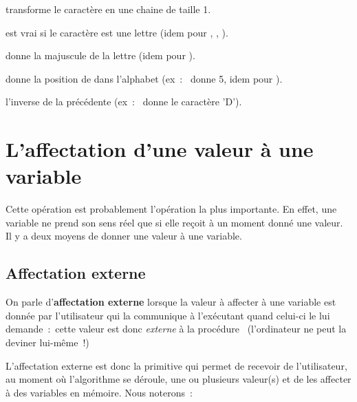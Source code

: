 			\begin{liste}
			\item {} transforme le caractère  en une chaine de taille 1.
			\item {} est vrai si le caractère  est une lettre
				(idem pour , 
				, 
				).
			\item {} donne la majuscule de la lettre 
				(idem pour ).
			\item {} donne la position de  dans l’alphabet (ex~:~ donne 5, 
			idem pour ).
			\item {} l’inverse de la précédente (ex~:~ donne le caractère ’D’).
			\end{liste}

			 
	\section{L’affectation d’une valeur à une variable}

		Cette opération est probablement l’opération la plus importante. En
		effet, une variable ne prend son sens réel que si elle reçoit à un
		moment donné une valeur. Il y a deux moyens de donner une valeur à une
		variable.

		\subsection{Affectation externe }

			On parle d’\textbf{affectation externe} lorsque la valeur à affecter à
			une variable est donnée par l’utilisateur qui la communique à
			l’exécutant quand celui-ci le lui demande~:~cette valeur est donc
			\textit{externe} à la procédure \ (l’ordinateur ne peut la deviner
			lui-même~!)

			L’affectation externe est donc la primitive qui permet de recevoir de
			l’utilisateur, au moment où l’algorithme se déroule,
			une ou plusieurs valeur(s) et de les affecter à des variables en
			mémoire. Nous noterons~:

			
